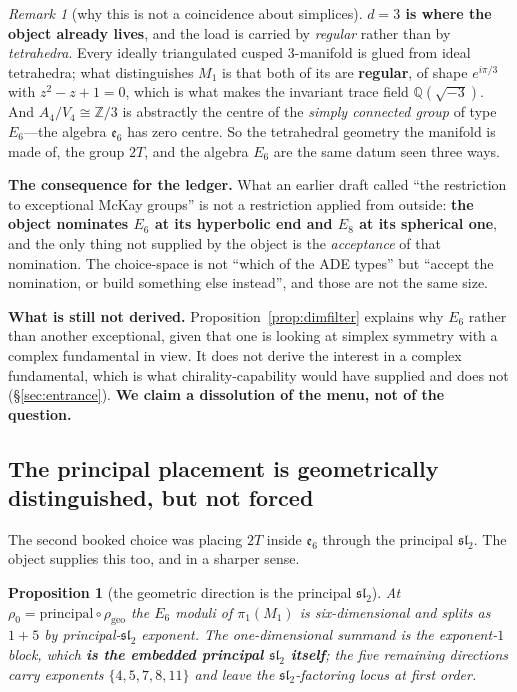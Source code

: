 \documentclass[11pt,reqno]{amsart}
\theoremstyle{plain}
\newtheorem{proposition}[theorem]{Proposition}
\theoremstyle{definition}
\theoremstyle{remark}
\newtheorem{remark}[theorem]{Remark}
\newcommand{\Q}{\mathbb{Q}}
\newcommand{\Z}{\mathbb{Z}}
\newcommand{\sll}{\mathfrak{sl}}
\newcommand{\ee}{\mathfrak{e}}
\begin{document}
\begin{remark}[why this is not a coincidence about simplices]\label{rem:nomination}
\textbf{$d=3$ is where the object already lives}, and the load is carried by
\emph{regular} rather than by \emph{tetrahedra}. Every ideally triangulated cusped
$3$-manifold is glued from ideal tetrahedra; what distinguishes $M_1$ is that both of its
are \textbf{regular}, of shape $e^{i\pi/3}$ with $z^2-z+1=0$, which is what makes the
invariant trace field $\Q(\sqrt{-3})$. And $A_4/V_4\cong\Z/3$ is abstractly the centre of the \emph{simply connected group} of type $E_6$---the algebra $\ee_6$ has zero centre. So the tetrahedral
geometry the manifold is made of, the group $2T$, and the algebra $E_6$ are the same
datum seen three ways.

\textbf{The consequence for the ledger.} What an earlier draft called ``the restriction
to exceptional McKay groups'' is not a restriction applied from outside: \textbf{the
object nominates $E_6$ at its hyperbolic end and $E_8$ at its spherical one}, and the
only thing not supplied by the object is the \emph{acceptance} of that nomination. The
choice-space is not ``which of the ADE types'' but ``accept the nomination, or build
something else instead'', and those are not the same size.

\textbf{What is still not derived.} Proposition~\ref{prop:dimfilter} explains why $E_6$
rather than another exceptional, given that one is looking at simplex symmetry with a
complex fundamental in view. It does not derive the interest in a complex fundamental,
which is what chirality-capability would have supplied and does not
(\S\ref{sec:entrance}). \textbf{We claim a dissolution of the menu, not of the question.}
\end{remark}

\subsection{The principal placement is geometrically distinguished, but not forced}
\label{sec:principaldir}

The second booked choice was placing $2T$ inside $\ee_6$ through the principal $\sll_2$.
The object supplies this too, and in a sharper sense.

\begin{proposition}[the geometric direction is the principal $\sll_2$]\label{prop:geodir}
At $\rho_0=\text{principal}\circ\rho_{\mathrm{geo}}$ the $E_6$ moduli of
$\pi_1(M_1)$ is six-dimensional and splits as $1+5$ by principal-$\sll_2$ exponent. The
one-dimensional summand is the exponent-$1$ block, which \textbf{is the embedded
principal $\sll_2$ itself}; the five remaining directions carry exponents
$\{4,5,7,8,11\}$ and leave the $\sll_2$-factoring locus at first order.
\end{proposition}
\end{document}
